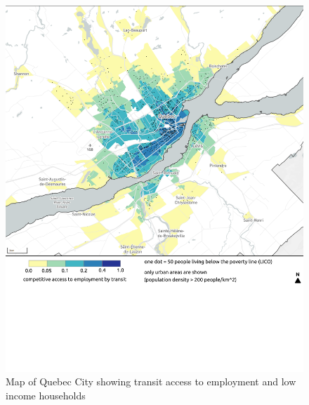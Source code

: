 \documentclass[11 pt, letterpaper]{article}
\begin{document}
{\begin{figure}[H]
	\vspace{5mm}
	\caption{Map of Quebec City showing transit access to employment and low income households} 
	\label{a_van}
	\centerline{\includegraphics[width=6.5in]{figures/appendix_maps/a_que.png}}
\end{figure}

}
\end{document}
